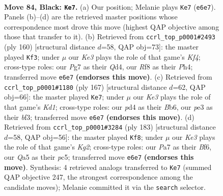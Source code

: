 \documentclass[11pt]{article}
\begin{document}
\clearpage

\begin{figure}[p]\centering
\begin{subfigure}{0.46\textwidth}\centering
\resizebox{\linewidth}{!}{%
\newchessgame
\chessboard[
  setfen={5r2/p5p1/2Q1k2r/q6P/3P4/4P3/7N/4b2K b - - 3 84},
  showmover=false,
  pgfstyle=straightmove, color=movearrow, markmove={e6-e7}
]}
\caption{}
\end{subfigure}\hfill
\begin{subfigure}{0.46\textwidth}\centering
\resizebox{\linewidth}{!}{%
\newchessgame
\chessboard[
  setfen={3Rb1k1/2r5/4P2p/p4B2/3Q1K1P/8/7q/8 w - - 63 81},
  showmover=false,
  pgfstyle=straightmove, color=movearrow, markmove={f4-f3}
]}
\caption{}
\end{subfigure}
\\[4pt]
\begin{subfigure}{0.46\textwidth}\centering
\resizebox{\linewidth}{!}{%
\newchessgame
\chessboard[
  setfen={3k2Q1/8/1b1r4/5r1p/P4P2/5BK1/8/8 b - - 5 84},
  showmover=false,
  pgfstyle=straightmove, color=movearrow, markmove={d8-e7}
]}
\caption{}
\end{subfigure}\hfill
\begin{subfigure}{0.46\textwidth}\centering
\resizebox{\linewidth}{!}{%
\newchessgame
\chessboard[
  setfen={8/3Q2k1/4pb2/2P3p1/3P4/5PKR/r2q4/8 b - - 1 92},
  showmover=false,
  pgfstyle=straightmove, color=movearrow, markmove={g7-f8}
]}
\caption{}
\end{subfigure}
\caption{\textbf{Move 84, Black: \texttt{Ke7}.} (a) Our position; Melanie plays \texttt{Ke7} (\texttt{e6e7}). Panels (b)--(d) are the retrieved master positions whose correspondence most drove this move (highest QAP objective among those that transfer to it). (b) Retrieved from \texttt{ccrl\_top\_p0001\#2493} (ply 160) [structural distance $d$=58, QAP obj=73]: the master played \texttt{Kf3}; under $\mu$ our \emph{Ke3} plays the role of that game's \emph{Kf4}; cross-type roles: our \emph{P}g7 as their \emph{Q}d4, our \emph{R}f8 as their \emph{P}h4; transferred move \texttt{e6e7} \textbf{(endorses this move)}. (c) Retrieved from \texttt{ccrl\_top\_p0001\#1180} (ply 167) [structural distance $d$=62, QAP obj=66]: the master played \texttt{Ke7}; under $\mu$ our \emph{Ke3} plays the role of that game's \emph{Kd1}; cross-type roles: our \emph{p}d4 as their \emph{B}b6, our \emph{p}e3 as their \emph{b}f3; transferred move \texttt{e6e7} \textbf{(endorses this move)}. (d) Retrieved from \texttt{ccrl\_top\_p0001\#3284} (ply 183) [structural distance $d$=58, QAP obj=56]: the master played \texttt{Kf8}; under $\mu$ our \emph{Ke3} plays the role of that game's \emph{Kg2}; cross-type roles: our \emph{P}a7 as their \emph{B}f6, our \emph{Q}a5 as their \emph{p}c5; transferred move \texttt{e6e7} \textbf{(endorses this move)}. Synthesis: 4 retrieved analogs transferred to \texttt{Ke7} (summed QAP objective 247, the strongest correspondence among the candidate moves); Melanie committed it via the \texttt{search} selector.}
\label{fig:thought-m167}
\end{figure}
\end{document}
